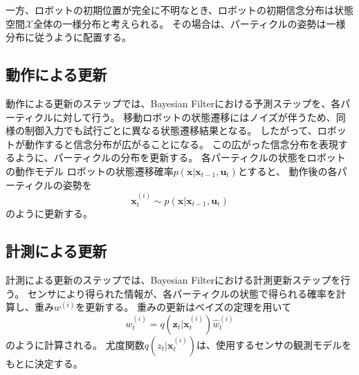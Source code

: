 一方、ロボットの初期位置が完全に不明なとき、ロボットの初期信念分布は状態空間$\mathcal{X}$全体の一様分布と考えられる。
その場合は、パーティクルの姿勢は一様分布に従うように配置する。



\subsection{動作による更新}

動作による更新のステップでは、Bayesian Filterにおける予測ステップを、各パーティクルに対して行う。
移動ロボットの状態遷移にはノイズが伴うため、同様の制御入力でも試行ごとに異なる状態遷移結果となる。
したがって、ロボットが動作すると信念分布が広がることになる。
この広がった信念分布を表現するように、パーティクルの分布を更新する。
各パーティクルの状態をロボットの動作モデル
ロボットの状態遷移確率$p(\bm{x} | \bm{x}_{t-1}, \bm{u}_{t})$とすると、
動作後の各パーティクルの姿勢を
\begin{equation}
\label{particle trans prob}
  \bm{x}^{(i)}_{t} \sim p(\bm{x} | \bm{x}_{t-1}, \bm{u}_{t})
\end{equation}
のように更新する。


\subsection{計測による更新}

計測による更新のステップでは、Bayesian Filterにおける計測更新ステップを行う。
センサにより得られた情報が、各パーティクルの状態で得られる確率を計算し、重み$w^{(i)}$を更新する。
重みの更新はベイズの定理を用いて
\begin{equation}
\label{weight}
  w^{(i)}_{t} = q(\bm{z}_{t} | \bm{x}^{(i)}_{t}) \hat{w}^{(i)}_{t}
\end{equation}
のように計算される。
尤度関数$q(z_{t} | \bm{x}^{(i)}_{t})$は、使用するセンサの観測モデルをもとに決定する。

